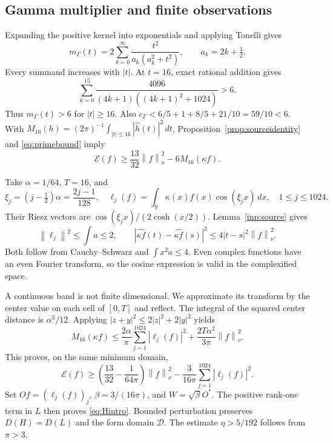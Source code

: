 \documentclass[11pt,a4paper]{article}
\numberwithin{equation}{section}
\theoremstyle{definition}\newtheorem{definition}[theorem]{Definition}
\theoremstyle{remark}\newtheorem{remark}[theorem]{Remark}
\newcommand{\DD}{\mathcal D}
\newcommand{\EE}{\mathcal E}
\newcommand{\R}{\mathbb R}
\newcommand{\norm}[1]{\left\|#1\right\|}
\begin{document}
\subsection{Gamma multiplier and finite observations}
Expanding the positive kernel into exponentials and applying Tonelli gives
\begin{equation}\label{eq:gammaseries}
 m_\Gamma(t)=2\sum_{k=0}^\infty\frac{t^2}{a_k(a_k^2+t^2)},
 \qquad a_k=2k+\tfrac12.
\end{equation}
Every summand increases with $|t|$. At $t=16$, exact rational addition gives
\begin{equation}
 \sum_{k=0}^{15}\frac{4096}{(4k+1)((4k+1)^2+1024)}>6.
\end{equation}
Thus $m_\Gamma(t)>6$ for $|t|\ge16$. Also
$c_\Gamma<6/5+1+8/5+21/10=59/10<6$.
With
$M_{16}(h)=(2\pi)^{-1}\int_{|t|\le16}|\widehat h(t)|^2\,dt$,
Proposition~\ref{prop:sourceidentity} and \eqref{eq:primebound} imply
\begin{equation}\label{eq:bandbound}
 \EE(f)\ge\frac{13}{32}\norm f_\nu^2-6M_{16}(\kappa f).
\end{equation}

Take $\alpha=1/64$, $T=16$, and
\begin{equation}\label{eq:observations}
 \xi_j=(j-\tfrac12)\alpha=\frac{2j-1}{128},\quad
 \ell_j(f)=\int_{\R}\kappa(x)f(x)\cos(\xi_jx)\,dx,
 \quad 1\le j\le1024.
\end{equation}
Their Riesz vectors are $\cos(\xi_jx)/(2\cosh(x/2))$. Lemma~\ref{inp:source} gives
\begin{equation}\label{eq:lip}
 \norm{\ell_j}^2\le\int a\le2,\qquad
 |\widehat{\kappa f}(t)-\widehat{\kappa f}(s)|^2
 \le4|t-s|^2\norm f_\nu^2.
\end{equation}
Both follow from Cauchy--Schwarz and $\int x^2a\le4$. Even complex functions have an even Fourier transform, so the cosine expression is valid in the complexified space.

A continuous band is not finite dimensional. We approximate its transform by the center value on each cell of $[0,T]$ and reflect. The integral of the squared center distance is $\alpha^3/12$. Applying $|z+y|^2\le2|z|^2+2|y|^2$ yields
\begin{equation}\label{eq:sampling}
 M_{16}(\kappa f)\le\frac{2\alpha}{\pi}\sum_{j=1}^{1024}|\ell_j(f)|^2
  +\frac{2T\alpha^2}{3\pi}\norm f_\nu^2.
\end{equation}
This proves, on the same minimum domain,
\begin{equation}\label{eq:coercivity}
 \EE(f)\ge\left(\frac{13}{32}-\frac1{64\pi}\right)\norm f_\nu^2
 -\frac3{16\pi}\sum_{j=1}^{1024}|\ell_j(f)|^2.
\end{equation}
Set $Of=(\ell_j(f))_j$, $\beta=3/(16\pi)$, and $W=\sqrt\beta O^*$. The positive rank-one term in $L$ then proves \eqref{eq:Hintro}. Bounded perturbation preserves $D(H)=D(L)$ and the form domain $\DD$. The estimate $\eta>5/192$ follows from $\pi>3$.
\end{document}
